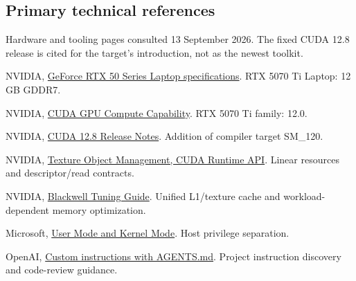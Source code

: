\documentclass[11pt,a4paper]{article}
\begin{document}
\subsection{Primary technical references}
Hardware and tooling pages consulted 13 September 2026. The fixed CUDA 12.8 release is cited for the target's introduction, not as the newest toolkit.
\small
\begin{description}[style=nextline,leftmargin=8mm]
\item[H1] NVIDIA, \href{https://www.nvidia.com/en-us/geforce/laptops/50-series/}{GeForce RTX 50 Series Laptop specifications}. RTX 5070 Ti Laptop: 12 GB GDDR7.
\item[H2] NVIDIA, \href{https://developer.nvidia.com/cuda/gpus}{CUDA GPU Compute Capability}. RTX 5070 Ti family: 12.0.
\item[H3] NVIDIA, \href{https://docs.nvidia.com/cuda/archive/12.8.0/cuda-toolkit-release-notes/index.html}{CUDA 12.8 Release Notes}. Addition of compiler target SM\_120.
\item[H4] NVIDIA, \href{https://docs.nvidia.com/cuda/cuda-runtime-api/group__CUDART__TEXTURE__OBJECT.html}{Texture Object Management, CUDA Runtime API}. Linear resources and descriptor/read contracts.
\item[H5] NVIDIA, \href{https://docs.nvidia.com/cuda/blackwell-tuning-guide/index.html}{Blackwell Tuning Guide}. Unified L1/texture cache and workload-dependent memory optimization.
\item[H6] Microsoft, \href{https://learn.microsoft.com/en-us/windows-hardware/drivers/gettingstarted/user-mode-and-kernel-mode}{User Mode and Kernel Mode}. Host privilege separation.
\item[H7] OpenAI, \href{https://developers.openai.com/codex/guides/agents-md}{Custom instructions with AGENTS.md}. Project instruction discovery and code-review guidance.
\end{description}
\normalsize
\end{document}
